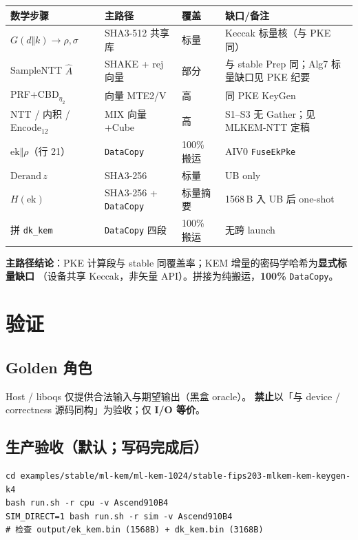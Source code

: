 \documentclass[UTF8,a4paper,11pt]{ctexart}
\begin{document}
\begin{longtable}{@{}L{3.8cm}L{3.6cm}L{1.4cm}L{4.0cm}@{}}
\toprule
数学步骤 & 主路径 & 覆盖 & 缺口/备注 \\
\midrule
$G(d\Vert k)\to\rho,\sigma$ & SHA3-512 共享库 & 标量 & Keccak 标量核（与 PKE 同） \\
SampleNTT $\hat{A}$ & SHAKE + rej 向量 & 部分 & 与 stable Prep 同；Alg7 标量缺口见 PKE 纪要 \\
PRF+CBD$_{\eta_2}$ & 向量 MTE2/V & 高 & 同 PKE KeyGen \\
NTT / 内积 / Encode$_{12}$ & MIX 向量+Cube & 高 & S1--S3 无 Gather；见 MLKEM-NTT 定稿 \\
$\mathrm{ek}\Vert\rho$（行 21） & \texttt{DataCopy} & 100\% 搬运 & AIV0 \texttt{FuseEkPke} \\
$\mathrm{Derand}\,z$ & SHA3-256 & 标量 & UB only \\
$H(\mathrm{ek})$ & SHA3-256 + \texttt{DataCopy} & 标量摘要 & 1568\,B 入 UB 后 one-shot \\
拼 \texttt{dk\_kem} & \texttt{DataCopy} 四段 & 100\% 搬运 & 无跨 launch \\
\bottomrule
\end{longtable}

\textbf{主路径结论}：PKE 计算段与 stable 同覆盖率；KEM 增量的密码学哈希为\textbf{显式标量缺口}
（设备共享 Keccak，非矢量 API）。拼接为纯搬运，\textbf{100\%} \texttt{DataCopy}。

\section{验证}
\label{sec:verify}

\subsection{Golden 角色}

Host / liboqs 仅提供合法输入与期望输出（黑盒 oracle）。
\textbf{禁止}以「与 device / correctness 源码同构」为验收；仅 \textbf{I/O 等价}。

\subsection{生产验收（默认；写码完成后）}

\begin{verbatim}
cd examples/stable/ml-kem/ml-kem-1024/stable-fips203-mlkem-kem-keygen-k4
bash run.sh -r cpu -v Ascend910B4
SIM_DIRECT=1 bash run.sh -r sim -v Ascend910B4
# 检查 output/ek_kem.bin (1568B) + dk_kem.bin (3168B)
\end{verbatim}
\end{document}
